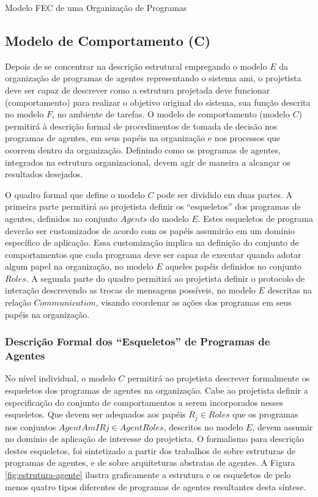 \begin{section}{Modelo FEC de uma Organização de Programas}
    
    \subsection{Modelo de Comportamento (C)}
    
        Depois de se concentrar na descrição estrutural empregando o modelo $E$ da organização de programas de agentes representando o sistema \acrshort{ami}, o projetista deve ser capaz de descrever como a estrutura projetada deve funcionar (comportamento) para realizar o objetivo original do sistema, sua função descrita no modelo $F$, no ambiente de tarefas. O modelo de comportamento (modelo $C$) permitirá à descrição formal de procedimentos de tomada de decisão nos programas de agentes, em seus papéis na organização e nos processos que ocorrem dentro da organização. Definindo como os programas de agentes, integrados na estrutura organizacional, devem agir de maneira a alcançar os resultados desejados.
        
        O quadro formal que define o modelo $C$ pode ser dividido em duas partes. A primeira parte permitirá ao projetista definir os “esqueletos” dos programas de agentes, definidos no conjunto $Agents$ do modelo $E$. Estes esqueletos de programa deverão ser customizados de acordo com os papéis assumirão em um domínio específico de aplicação. Essa customização implica na definição do conjunto de comportamentos que cada programa deve ser capaz de executar quando adotar algum papel na organização, no modelo $E$ aqueles papéis definidos no conjunto $Roles$. A segunda parte do quadro permitirá ao projetista definir o protocolo de interação descrevendo as trocas de mensagens possíveis, no modelo $E$ descritas na relação $Communication$, visando coordenar as ações dos programas em seus papéis na organização.
        
        \subsubsection{Descrição Formal dos “Esqueletos” de Programas de Agentes}
        
            No nível individual, o modelo $C$ permitirá ao projetista descrever formalmente os esqueletos dos programas de agentes na organização. Cabe ao projetista definir a especificação do conjunto de comportamentos a serem incorporados nesses esqueletos. Que devem ser adequados aos papéis $R_j \in Roles$ que os programas nos conjuntos $AgentAmIRj \in AgentRoles$, descritos no modelo $E$, devem assumir no domínio de aplicação de interesse do projetista. O formalismo para descrição destes esqueletos, foi sintetizado a partir dos trabalhos de  sobre estruturas de programas de agentes, e de  sobre arquiteturas abstratas de agentes. A Figura \ref{fig:estrutura-agente} ilustra graficamente a estrutura e os esqueletos de pelo menos quatro tipos diferentes de programas de agentes resultantes desta síntese.
            

\end{section}
